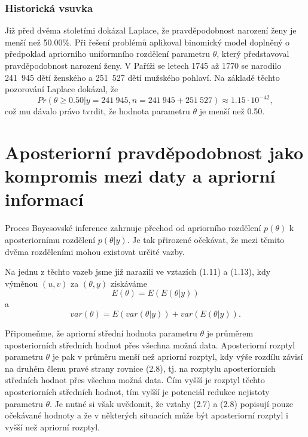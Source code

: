 \subsubsection{Historická vsuvka}

Již před dvěma stoletími dokázal Laplace, že pravděpodobnost narození ženy je menší než 50.00\%. Při řešení problémů aplikoval binomický model doplněný o předpoklad apriorního uniformního rozdělení parametru $\theta$, který představoval pravděpodobnost narození ženy. V Paříži se letech 1745 až 1770 se narodilo 241~945 dětí ženského a 251~527 dětí mužského pohlaví. Na základě těchto pozorování Laplace dokázal, že
\begin{equation*}
Pr(\theta \ge 0.50 | y = 241~945, n = 241~945 + 251~527) \approx 1.15 \cdot 10^{-42},
\end{equation*}
což mu dávalo právo tvrdit, že hodnota parametru $\theta$ je menší než 0.50.

\section{Aposteriorní pravděpodobnost jako kompromis mezi daty a apriorní informací}

Proces Bayesovské inference zahrnuje přechod od apriorního rozdělení $p(\theta)$ k aposteriornímu rozdělení $p(\theta | y)$. Je tak přirozené očekávat, že mezi těmito dvěma rozděleními mohou existovat určité vazby.

Na jednu z těchto vazeb jsme již narazili ve vztazích (1.11) a (1.13), kdy výměnou $(u, v)$ za $(\theta, y)$ získáváme
\begin{equation}
E(\theta) = E(E(\theta | y))
\end{equation}
a
\begin{equation}
var(\theta) = E(var(\theta | y)) + var(E(\theta | y)).
\end{equation}

Připomeňme, že apriorní střední hodnota parametru $\theta$ je průměrem aposteriorních středních hodnot přes všechna možná data. Aposteriorní rozptyl parametru $\theta$ je pak v průměru menší než apriorní rozptyl, kdy výše rozdílu závisí na druhém členu pravé strany rovnice (2.8), tj. na rozptylu aposteriorních středních hodnot přes všechna možná data. Čím vyšší je rozptyl těchto aposteriorních středních hodnot, tím vyšší je potenciál redukce nejistoty parametru $\theta$. Je nutné si však uvědomit, že vztahy (2.7) a (2.8) popisují pouze očekávané hodnoty a že v některých situacích může být aposteriorní rozptyl i vyšší než apriorní rozptyl.


